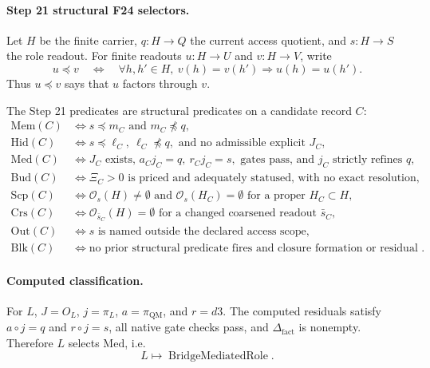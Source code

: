 \paragraph{Step 21 structural F24 selectors.}
Let \(H\) be the finite carrier, \(q:H\to Q\) the current access
quotient, and \(s:H\to S\) the role readout.  For finite readouts
\(u:H\to U\) and \(v:H\to V\), write
\[
  u\preceq v
  \quad\Longleftrightarrow\quad
  \forall h,h'\in H,\ v(h)=v(h')\Rightarrow u(h)=u(h').
\]
Thus \(u\preceq v\) says that \(u\) factors through \(v\).

The Step 21 predicates are structural predicates on a candidate record
\(C\):
\[
\begin{array}{ll}
\mathrm{Mem}(C) &\iff s\preceq m_C \text{ and } m_C\npreceq q,\\
\mathrm{Hid}(C) &\iff s\preceq \ell_C,\ \ell_C\npreceq q,\text{ and no admissible explicit }J_C,\\
\mathrm{Med}(C) &\iff J_C \text{ exists, } a_Cj_C=q,\ r_Cj_C=s,\text{ gates pass, and }j_C\text{ strictly refines }q,\\
\mathrm{Bud}(C) &\iff \Xi_C>0 \text{ is priced and adequately statused, with no exact resolution},\\
\mathrm{Scp}(C) &\iff \mathcal O_s(H)\ne\emptyset \text{ and }\mathcal O_s(H_C)=\emptyset\text{ for a proper }H_C\subset H,\\
\mathrm{Crs}(C) &\iff \mathcal O_{\bar s_C}(H)=\emptyset \text{ for a changed coarsened readout }\bar s_C,\\
\mathrm{Out}(C) &\iff s \text{ is named outside the declared access scope},\\
\mathrm{Blk}(C) &\iff \text{no prior structural predicate fires and closure formation or residual status fails}.
\end{array}
\]

\paragraph{Computed classification.}
For \(L\), \(J=O_L\), \(j=\pi_L\), \(a=\pi_{\mathrm{QM}}\), and
\(r=d3\).  The computed residuals satisfy \(a\circ j=q\) and
\(r\circ j=s\), all native gate checks pass, and \(\Delta_{\mathrm{fact}}\)
is nonempty.  Therefore \(L\) selects \(\mathrm{Med}\), i.e.
\[
  L\mapsto \operatorname{BridgeMediatedRole}.
\]
